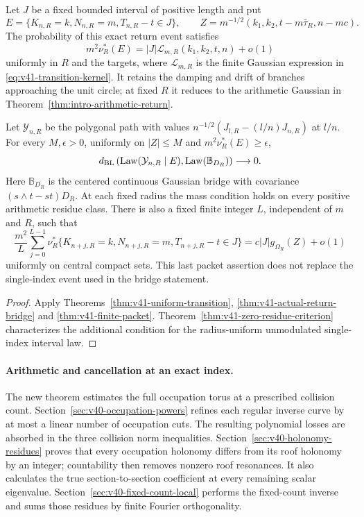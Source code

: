 \begin{leadtheorem}
\label{thm:intro-v41-bridge}
Let $J$ be a fixed bounded interval of positive length and put
\[
 E=\{K_{n,R}=k,N_{n,R}=m,T_{n,R}-t\in J\},\qquad
 Z=m^{-1/2}(k_1,k_2,t-m\bar\tau_R,n-mc).
\]
The probability of this exact return event satisfies
\[
 m^2\nu_R^*(E)=|J|\mathcal L_{m,R}(k_1,k_2,t,n)+o(1)
\]
uniformly in $R$ and the targets, where $\mathcal L_{m,R}$ is the
finite Gaussian expression in \eqref{eq:v41-transition-kernel}.
It retains the damping and drift of branches approaching the unit
circle; at fixed $R$ it reduces to the arithmetic Gaussian in Theorem~\ref{thm:intro-arithmetic-return}.

Let $\mathcal Y_{n,R}$ be the polygonal path with values
$n^{-1/2}(J_{l,R}-(l/n)J_{n,R})$ at $l/n$.
For every $M,\epsilon>0$, uniformly on $|Z|\le M$ and
$m^2\nu_R^*(E)\ge\epsilon$,
\[
 d_{\rm BL}\left(\operatorname{Law}(\mathcal Y_{n,R}\mid E),
                         \operatorname{Law}(\mathbb B_{D_R})\right)
                                      \longrightarrow0.
\]
Here $\mathbb B_{D_R}$ is the centered continuous Gaussian bridge with
covariance $(s\wedge t-st)D_R$. At each fixed radius the mass condition
holds on every positive arithmetic residue class. There is also a fixed
finite integer $L$, independent of $m$ and $R$, such that
\[
 \frac{m^2}{L}\sum_{j=0}^{L-1}
 \nu_R^*\{K_{n+j,R}=k,N_{n+j,R}=m,T_{n+j,R}-t\in J\}
                         =c|J|g_{\Omega_R}(Z)+o(1)
\]
uniformly on central compact sets. This last packet assertion does not
replace the single-index event used in the bridge statement.
\end{leadtheorem}
\begin{proof}
Apply Theorems~\ref{thm:v41-uniform-transition},
\ref{thm:v41-actual-return-bridge} and \ref{thm:v41-finite-packet}.
Theorem~\ref{thm:v41-zero-residue-criterion} characterizes the additional
condition for the radius-uniform unmodulated single-index interval law.
\end{proof}

\paragraph{Arithmetic and cancellation at an exact index.}
The new theorem estimates the full occupation torus at a prescribed
collision count. Section~\ref{sec:v40-occupation-powers} refines each
regular inverse curve by at most a linear number of occupation cuts.
The resulting polynomial losses are absorbed in the three collision
norm inequalities. Section~\ref{sec:v40-holonomy-residues} proves
that every occupation holonomy differs from its roof holonomy by an
integer; countability then removes nonzero roof resonances. It also
calculates the true section-to-section coefficient at every remaining
scalar eigenvalue. Section~\ref{sec:v40-fixed-count-local} performs
the fixed-count inverse and sums those residues by finite Fourier
orthogonality.


